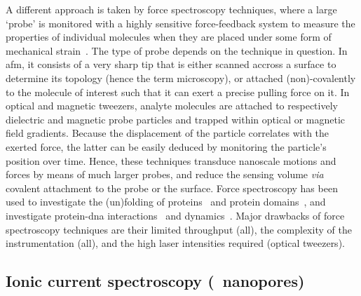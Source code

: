 A different approach is taken by force spectroscopy techniques, where a large `probe' is monitored with a
highly sensitive force-feedback system to measure the properties of individual molecules when they are placed
under some form of mechanical strain~\cite{Neuman-2008}. The type of probe depends on the technique in
question. In \gls{afm}, it consists of a very sharp tip that is either scanned accross a surface to determine
its topology (hence the term microscopy), or attached (non)-covalently to the molecule of interest such that
it can exert a precise pulling force on it. In optical and magnetic tweezers, analyte molecules are attached
to respectively dielectric and magnetic probe particles and trapped within optical or magnetic field
gradients. Because the displacement of the particle correlates with the exerted force, the latter can be
easily deduced by monitoring the particle's position over time. Hence, these techniques transduce nanoscale
motions and forces by means of much larger probes, and reduce the sensing volume \textit{via} covalent
attachment to the probe or the surface. Force spectroscopy has been used to investigate the (un)folding of
proteins~\cite{Bustamante-2020,Jagannathan-2013} and protein domains~\cite{Rief-1997,Kellermayer-1997}, and
investigate protein-\gls{dna} interactions~\cite{Abbondanzieri-2005,Shlyakhtenko-2007,Vanderlinden-2019} and
dynamics~\cite{Lyubchenko-2018,Brouns-2018}. Major drawbacks of force spectroscopy techniques are their
limited throughput (all), the complexity of the instrumentation (all), and the high laser intensities required
(optical tweezers).


\subsection{Ionic current spectroscopy (\ie~nanopores)}
%

